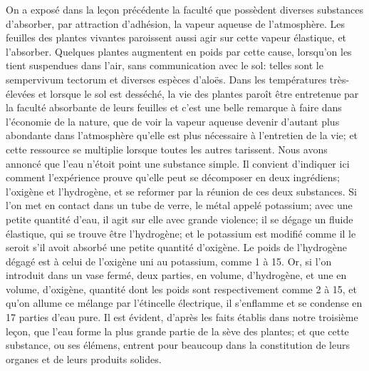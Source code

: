 On a exposé dans la leçon précédente la faculté que possèdent diverses substances d'absorber, par attraction d'adhésion, la vapeur aqueuse de l'atmosphère. Les feuilles des plantes vivantes paroissent aussi agir sur cette vapeur élastique, et l'absorber. Quelques plantes augmentent en poids par cette cause, lorsqu'on les tient suspendues dans l'air, sans communication avec le sol: telles sont le sempervivum tectorum et diverses espèces d'aloës. Dans les températures très-élevées et lorsque le sol est desséché, la vie des plantes paroît être entretenue par la faculté absorbante de leurs feuilles et c'est une belle remarque à faire dans l'économie de la nature, que de voir la vapeur aqueuse devenir d'autant plus abondante dans l'atmosphère qu'elle est plus nécessaire à l'entretien de la vie; et cette ressource se multiplie lorsque toutes les autres tarissent.
Nous avons annoncé que l'eau n'étoit point\setcounter{page}{6} une substance simple. Il convient d'indiquer ici comment l'expérience prouve qu'elle peut se décomposer en deux ingrédiens; l'oxigène et l'hydrogène, et se reformer par la réunion de ces deux substances.
Si l'on met en contact dans un tube de verre, le métal appelé potassium; avec une petite quantité d'eau, il agit sur elle avec grande violence; il se dégage un fluide élastique, qui se trouve être l'hydrogène; et le potassium est modifié comme il le seroit s'il avoit absorbé une petite quantité d'oxigène. Le poids de l'hydrogène dégagé est à celui de l'oxigène uni au potassium, comme 1 à 15. Or, si l'on introduit dans un vase fermé, deux parties, en volume, d'hydrogène, et une en volume, d'oxigène, quantité dont les poids sont respectivement comme 2 à 15, et qu'on allume ce mélange par l'étincelle électrique, il s'enflamme et se condense en 17 parties d'eau pure.
Il est évident, d'après les faits établis dans notre troisième leçon, que l'eau forme la plus grande partie de la sève des plantes; et que cette substance, ou ses élémens, entrent pour beaucoup dans la constitution de leurs organes et de leurs produits solides.
